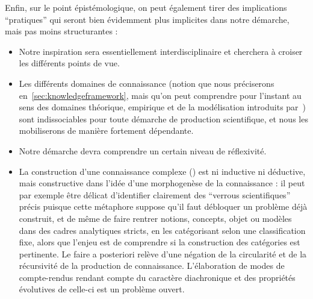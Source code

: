 Enfin, sur le point épistémologique, on peut également tirer des implications ``pratiques'' qui seront bien évidemment plus implicites dans notre démarche, mais pas moins structurantes :

\begin{itemize}
	\item Notre inspiration sera essentiellement interdisciplinaire et cherchera à croiser les différents points de vue.
	\item Les différents domaines de connaissance (notion que nous préciserons en~\ref{sec:knowledgeframework}, mais qu'on peut comprendre pour l'instant au sens des domaines théorique, empirique et de la modélisation introduits par~\cite{livet2010}) sont indissociables pour toute démarche de production scientifique, et nous les mobiliserons de manière fortement dépendante.
	\item Notre démarche devra comprendre un certain niveau de réflexivité.
	\item La construction d'une connaissance complexe (\cite{morin1991methode}) est ni inductive ni déductive, mais constructive dans l'idée d'une morphogenèse de la connaissance : il peut par exemple être délicat d'identifier clairement des ``verrous scientifiques'' précis puisque cette métaphore suppose qu'il faut débloquer un problème déjà construit, et de même de faire rentrer notions, concepts, objet ou modèles dans des cadres analytiques stricts, en les catégorisant selon une classification fixe, alors que l'enjeu est de comprendre si la construction des catégories est pertinente. Le faire a posteriori relève d'une négation de la circularité et de la récursivité de la production de connaissance. L'élaboration de modes de compte-rendus rendant compte du caractère diachronique et des propriétés évolutives de celle-ci est un problème ouvert.
\end{itemize}






\stars












